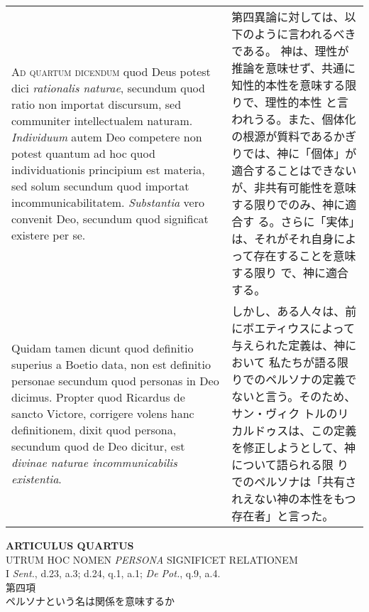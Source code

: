 \documentclass[10pt]{jsarticle} %
\begin{document}
\begin{longtable}{p{21em}p{21em}}
{\scshape Ad quartum dicendum} quod Deus potest dici {\itshape rationalis naturae}, secundum
quod ratio non importat discursum, sed communiter intellectualem
naturam. {\itshape Individuum} autem Deo competere non potest quantum ad hoc quod
individuationis principium est materia, sed solum secundum quod importat
incommunicabilitatem. {\itshape Substantia} vero convenit Deo, secundum quod
significat existere per se. 


&


第四異論に対しては、以下のように言われるべきである。
神は、理性が推論を意味せず、共通に知性的本性を意味する限りで、理性的本性
 と言われうる。また、個体化の根源が質料であるかぎりでは、神に「個体」が
 適合することはできないが、非共有可能性を意味する限りでのみ、神に適合す
 る。さらに「実体」は、それがそれ自身によって存在することを意味する限り
 で、神に適合する。

\\

Quidam tamen dicunt quod definitio superius
a Boetio data, non est definitio personae secundum quod personas in Deo
dicimus. Propter quod Ricardus de sancto Victore, corrigere volens hanc
definitionem, dixit quod persona, secundum quod de Deo dicitur, est
{\itshape divinae naturae incommunicabilis existentia}.


&

しかし、ある人々は、前にボエティウスによって与えられた定義は、神において
 私たちが語る限りでのペルソナの定義でないと言う。そのため、サン・ヴィク
 トルのリカルドゥスは、この定義を修正しようとして、神について語られる限
 りでのペルソナは「共有されえない神の本性をもつ存在者」と言った。




\end{longtable}
\newpage





\begin{center}
 {\Large {\bf ARTICULUS QUARTUS}}\\
 {\large UTRUM HOC NOMEN {\itshape PERSONA} SIGNIFICET RELATIONEM}\\
 {\footnotesize I {\itshape Sent.}, d.23, a.3; d.24, q.1, a.1; {\itshape
 De Pot.}, q.9, a.4.}\\
 {\Large 第四項\\ペルソナという名は関係を意味するか}
\end{center}
\end{document}
